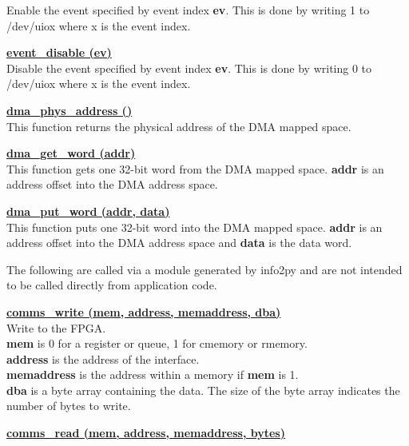                 Enable the event specified by event index {\bf ev}. This is done by
                writing 1 to /dev/uiox where x is the event index.

            \underline{{\bf event\_disable (ev)}} \\

                Disable the event specified by event index {\bf ev}. This is done by
                writing 0 to /dev/uiox where x is the event index.

            \underline{{\bf dma\_phys\_address ()}} \\

                This function returns the physical address of the DMA mapped space.

            \underline{{\bf dma\_get\_word (addr)}} \\

                This function gets one 32-bit word from the DMA mapped space. {\bf addr}
                is an address offset into the DMA address space.

            \underline{{\bf dma\_put\_word (addr, data)}} \\

                This function puts one 32-bit word into the DMA mapped space. {\bf addr}
                is an address offset into the DMA address space and {\bf data} is the data word.


            The following are called via a module generated by info2py and are
            not intended to be called directly from application code.

            \underline{{\bf comms\_write (mem, address, memaddress, dba)}} \\

                Write to the FPGA.\\
                {\bf mem} is 0 for a register or queue, 1 for cmemory or rmemory.\\
                {\bf address} is the address of the interface.\\
                {\bf memaddress} is the address within a memory if {\bf mem} is 1.\\
                {\bf dba} is a byte array containing the data. The size of the byte array
                indicates the number of bytes to write.

            \underline{{\bf comms\_read (mem, address, memaddress, bytes)}} \\

